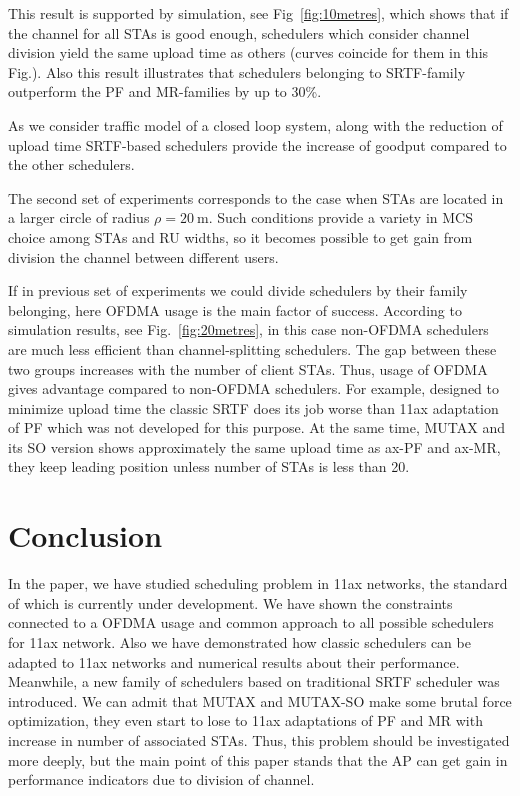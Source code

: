 This result is supported by simulation, see Fig~\ref{fig:10metres}, which shows that if the channel for all STAs is good enough, schedulers which consider channel division yield the same upload time as others (curves coincide for them in this Fig.). Also this result illustrates that schedulers belonging to SRTF-family outperform the PF and MR-families by up to 30\%. 

As we consider traffic model of a closed loop system, along with the reduction of upload time SRTF-based schedulers provide the increase of goodput compared to the other schedulers.

The second set of experiments corresponds to the case when STAs are located in a larger circle of radius $\rho = \SI{20}{\m}$.
Such conditions provide a variety in MCS choice among STAs and RU widths, so it becomes possible to get gain from division the channel between different users.

If in previous set of experiments we could divide schedulers by their family belonging, here OFDMA usage is the main factor of success.
According to simulation results, see Fig.~\ref{fig:20metres}, in this case non-OFDMA schedulers are  much less efficient than channel-splitting schedulers. 
The gap between these two groups increases with the number of client STAs. 
Thus, usage of OFDMA gives advantage compared to non-OFDMA schedulers. 
\textcolor{prpl}{For example, designed to minimize upload time the classic SRTF does its job worse than 11ax adaptation of PF which was not developed for this purpose.}
At the same time, MUTAX and its SO version shows approximately the same upload time as ax-PF and ax-MR, they keep leading position unless number of STAs is less than 20.  

\section{Conclusion}
\label{sec:conclusion}

In the paper, we have studied scheduling problem in 11ax networks, the standard of which is currently under development. We have shown the constraints connected to a OFDMA usage and common approach to all possible schedulers for 11ax network.
Also we have demonstrated how classic schedulers can be adapted to 11ax networks and numerical results about their performance. 
Meanwhile, a new family of schedulers based on traditional SRTF scheduler was introduced. 
We can admit that MUTAX and MUTAX-SO make some brutal force optimization, they even start to lose to 11ax adaptations of PF and MR with increase in number of associated STAs. 
Thus, this problem should be investigated more deeply, but the main point of this paper stands that the AP can get gain in performance indicators due to division of channel.


 

